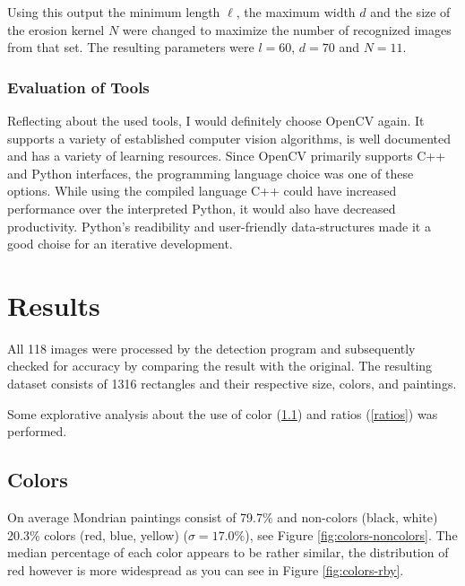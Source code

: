 \documentclass[serif,article,noparskip]{agse-thesis}
\begin{document}
Using this output the minimum length $\ell$, the maximum width $d$ and the size of
the erosion kernel $N$ were changed to maximize the number of recognized images
from that set. The resulting parameters were $l = 60$, $d = 70$ and $N =11$.

\subsubsection{Evaluation of Tools}

Reflecting about the used tools, I would definitely choose OpenCV again. It
supports a variety of established computer vision algorithms, is well documented
and has a variety of learning resources. Since OpenCV primarily supports C++ and
Python interfaces, the programming language choice was one of these options.
While using the compiled language C++ could have increased performance over the
interpreted Python, it would also have decreased productivity.
Python's readibility and user-friendly data-structures made it a good choise for
an iterative development.

\section{Results} \label{results}

 All 118 images were processed by the detection program and subsequently checked
 for accuracy by comparing the result with the original. The resulting dataset
 consists of 1316 rectangles and their respective size, colors, and paintings.

Some explorative analysis about the use of color (\ref{color}) and ratios
(\ref{ratios}) was performed.

\subsection{Colors} \label{color}

On average Mondrian paintings consist of 79.7\%  and non-colors (black, white)
20.3\% colors (red, blue, yellow) ($\sigma = 17.0\%$), see Figure
\ref{fig:colors-noncolors}. The median percentage of each color appears to be
rather similar, the distribution of red however is more widespread as you can
see in Figure \ref{fig:colors-rby}.
\end{document}
